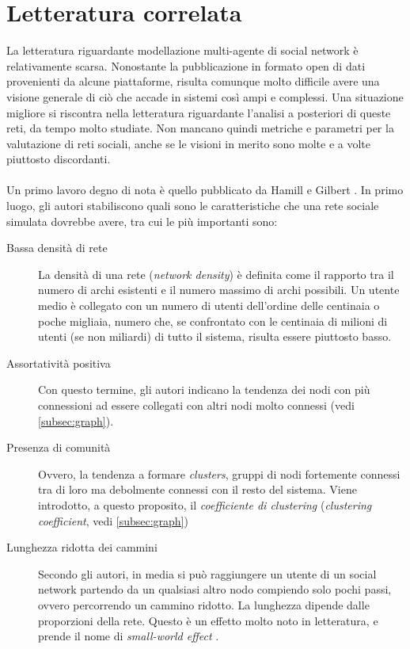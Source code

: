 \documentclass[a4paper,12pt]{article}
\begin{document}
\section{Letteratura correlata}
\label{sec:letteratura}
La letteratura riguardante modellazione multi-agente di social network è relativamente scarsa. Nonostante la pubblicazione in formato open di dati provenienti da alcune piattaforme, risulta comunque molto difficile avere una visione generale di ciò che accade in sistemi così ampi e complessi. Una situazione migliore si riscontra nella letteratura riguardante l'analisi a posteriori di queste reti, da tempo molto studiate. Non mancano quindi metriche e parametri per la valutazione di reti sociali, anche se le visioni in merito sono molte e a volte piuttosto discordanti.\\
\\
Un primo lavoro degno di nota è quello pubblicato da Hamill e Gilbert \cite{gilbert}. In primo luogo, gli autori stabiliscono quali sono le caratteristiche che una rete sociale simulata dovrebbe avere, tra cui le più importanti sono:
\begin{description}
\item[Bassa densità di rete] La densità di una rete \cite{gilbert} (\textit{network density}) è definita come il rapporto tra il numero di archi esistenti e il numero massimo di archi possibili. Un utente medio è collegato con un numero di utenti dell'ordine delle centinaia o poche migliaia, numero che, se confrontato con le centinaia di milioni di utenti (se non miliardi) di tutto il sistema, risulta essere piuttosto basso. 
\item[Assortatività positiva] Con questo termine, gli autori indicano la tendenza dei nodi con più connessioni ad essere collegati con altri nodi molto connessi (vedi \ref{subsec:graph}). 
\item[Presenza di comunità] Ovvero, la tendenza a formare \textit{clusters}, gruppi di nodi fortemente connessi tra di loro ma debolmente connessi con il resto del sistema. Viene introdotto, a questo proposito, il \textit{coefficiente di clustering} (\textit{clustering coefficient}, vedi  \ref{subsec:graph}) 
\item[Lunghezza ridotta dei cammini] Secondo gli autori, in media si può raggiungere un utente di un social network partendo da un qualsiasi altro nodo compiendo solo pochi passi, ovvero percorrendo un cammino ridotto. La lunghezza dipende dalle proporzioni della rete. Questo è un effetto molto noto in letteratura, e prende il nome di \textit{small-world effect} \cite{barabasi}\cite{newman}.
\end{description}
\end{document}
